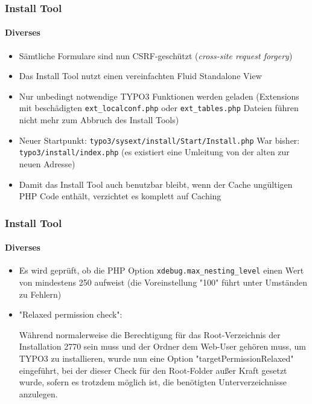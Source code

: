 
\begin{frame}[fragile]
	\frametitle{Install Tool}
	\framesubtitle{Diverses}

	\begin{itemize}
		\item Sämtliche Formulare sind nun CSRF-geschützt\newline
			\smaller(\textit{cross-site request forgery})\normalsize
		\item Das Install Tool nutzt einen vereinfachten Fluid Standalone View
		\item Nur unbedingt notwendige TYPO3 Funktionen werden geladen\newline
			\small(Extensions mit beschädigten \texttt{ext\_localconf.php} oder \texttt{ext\_tables.php} Dateien führen nicht mehr zum Abbruch des Install Tools)\normalsize
		\item Neuer Startpunkt:	\tabto{3.2cm} \texttt{typo3/sysext/install/Start/Install.php}\newline
			War bisher:			\tabto{3.2cm} \texttt{typo3/install/index.php}\newline
			\small(es existiert eine Umleitung von der alten zur neuen Adresse)\normalsize
		\item Damit das Install Tool auch benutzbar bleibt, wenn der Cache ungültigen PHP Code enthält, verzichtet es komplett auf Caching
	\end{itemize}

\end{frame}


\begin{frame}[fragile]
	\frametitle{Install Tool}
	\framesubtitle{Diverses}

	\begin{itemize}
		\item Es wird geprüft, ob die PHP Option \texttt{xdebug.max\_nesting\_level} einen Wert von mindestens 250 aufweist\newline
			\small(die Voreinstellung "100" führt unter Umständen zu Fehlern)\normalsize
		\item "Relaxed permission check":

			\small
				Während normalerweise die Berechtigung für das Root-Verzeichnis der Installation
				2770 sein muss und der Ordner dem Web-User gehören muss, um TYPO3 zu installieren,
				wurde nun eine Option "targetPermissionRelaxed" eingeführt, bei der dieser Check
				für den Root-Folder außer Kraft gesetzt wurde, sofern es trotzdem möglich ist,
				die benötigten Unterverzeichnisse anzulegen.
			\normalsize

	\end{itemize}

\end{frame}

